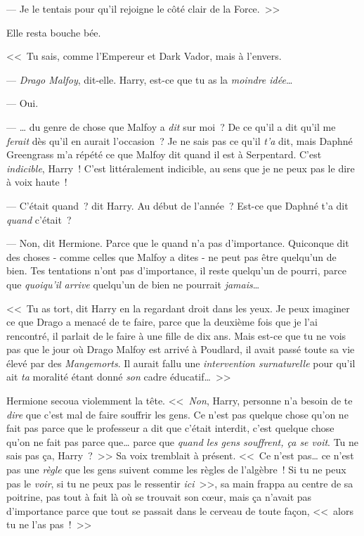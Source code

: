 --- Je le tentais pour qu'il rejoigne le côté clair de la Force.~>>

Elle resta bouche bée.

<<~Tu sais, comme l'Empereur et Dark Vador, mais à l'envers.

--- \emph{Drago Malfoy}, dit-elle. Harry, est-ce que tu as la \emph{moindre idée}…

--- Oui.

--- … du genre de chose que Malfoy a \emph{dit} sur moi~? De ce qu'il a dit qu'il me \emph{ferait} dès qu'il en aurait l'occasion~? Je ne sais pas ce qu'il \emph{t'a} dit, mais Daphné Greengrass m'a répété ce que Malfoy dit quand il est à Serpentard. C'est \emph{indicible}, Harry~! C'est littéralement indicible, au sens que je ne peux pas le dire à voix haute~!

--- C'était quand~? dit Harry. Au début de l'année~? Est-ce que Daphné t'a dit \emph{quand} c'était~?

--- Non, dit Hermione. Parce que le quand n'a pas d'importance. Quiconque dit des choses - comme celles que Malfoy a dites - ne peut pas être quelqu'un de bien. Tes tentations n'ont pas d'importance, il reste quelqu'un de pourri, parce que \emph{quoiqu'il arrive} quelqu'un de bien ne pourrait \emph{jamais}…

<<~Tu as tort, dit Harry en la regardant droit dans les yeux. Je peux imaginer ce que Drago a menacé de te faire, parce que la deuxième fois que je l'ai rencontré, il parlait de le faire à une fille de dix ans. Mais est-ce que tu ne vois pas que le jour où Drago Malfoy est arrivé à Poudlard, il avait passé toute sa vie élevé par des \emph{Mangemorts}. Il aurait fallu une \emph{intervention surnaturelle} pour qu'il ait \emph{ta} moralité étant donné \emph{son} cadre éducatif…~>>

Hermione secoua violemment la tête. <<~\emph{Non}, Harry, personne n'a besoin de te \emph{dire} que c'est mal de faire souffrir les gens. Ce n'est pas quelque chose qu'on ne fait pas parce que le professeur a dit que c'était interdit, c'est quelque chose qu'on ne fait pas parce que… parce que \emph{quand les gens souffrent, ça se voit}. Tu ne sais pas ça, Harry~?~>> Sa voix tremblait à présent. <<~Ce n'est pas… ce n'est pas une \emph{règle} que les gens suivent comme les règles de l'algèbre~! Si tu ne peux pas le \emph{voir}, si tu ne peux pas le ressentir \emph{ici}~>>, sa main frappa au centre de sa poitrine, pas tout à fait là où se trouvait son cœur, mais ça n'avait pas d'importance parce que tout se passait dans le cerveau de toute façon, <<~alors tu ne l'as pas~!~>>

